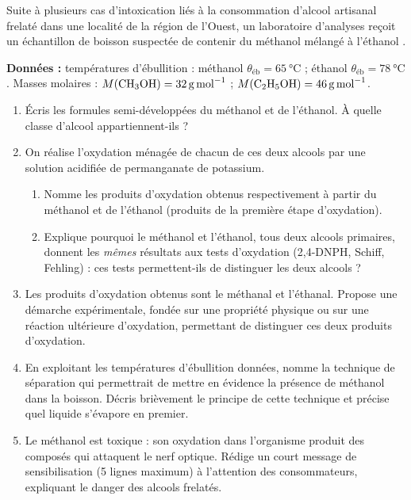 \documentclass[11pt]{article}
\begin{document}
\begin{exercice}
Suite à plusieurs cas d'intoxication liés à la consommation d'alcool artisanal frelaté dans une localité de la région de l'Ouest, un laboratoire d'analyses reçoit un échantillon de boisson suspectée de contenir du méthanol  mélangé à l'éthanol .

\textbf{Données :} températures d'ébullition : méthanol $\theta_{\text{éb}} = \SI{65}{\celsius}$ ; éthanol $\theta_{\text{éb}} = \SI{78}{\celsius}$. Masses molaires : $M(\ce{CH3OH}) = \SI{32}{g.mol^{-1}}$ ; $M(\ce{C2H5OH}) = \SI{46}{g.mol^{-1}}$.
\begin{enumerate}
\item Écris les formules semi-développées du méthanol et de l'éthanol. À quelle classe d'alcool appartiennent-ils ?
\item On réalise l'oxydation ménagée de chacun de ces deux alcools par une solution acidifiée de permanganate de potassium.
\begin{enumerate}
\item Nomme les produits d'oxydation obtenus respectivement à partir du méthanol et de l'éthanol (produits de la première étape d'oxydation).
\item Explique pourquoi le méthanol et l'éthanol, tous deux alcools primaires, donnent les \emph{mêmes} résultats aux tests d'oxydation (2,4-DNPH, Schiff, Fehling) : ces tests permettent-ils de distinguer les deux alcools ?
\end{enumerate}
\item Les produits d'oxydation obtenus sont le méthanal et l'éthanal. Propose une démarche expérimentale, fondée sur une propriété physique ou sur une réaction ultérieure d'oxydation, permettant de distinguer ces deux produits d'oxydation.
\item En exploitant les températures d'ébullition données, nomme la technique de séparation qui permettrait de mettre en évidence la présence de méthanol dans la boisson. Décris brièvement le principe de cette technique et précise quel liquide s'évapore en premier.
\item Le méthanol est toxique : son oxydation dans l'organisme produit des composés qui attaquent le nerf optique. Rédige un court message de sensibilisation (5 lignes maximum) à l'attention des consommateurs, expliquant le danger des alcools frelatés.
\end{enumerate}
\end{exercice}
\end{document}

